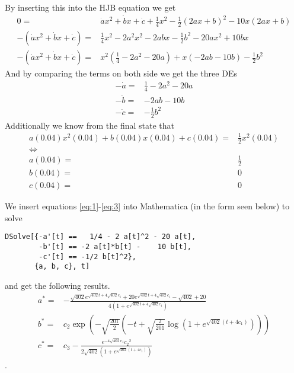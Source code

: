 \documentclass{article}
\begin{document}
By inserting this into the HJB equation we get
\begin{align}
	0 =& \dot{a}x^2 + \dot{b}x + \dot{c} + \frac{1}{4}x^2 - \frac{1}{2}(2ax + b) ^2 - 10x(2ax + b) \\
	-(\dot{a}x^2 + \dot{b}x + \dot{c})=& \frac{1}{4}x^2 -2 a^2 x^2 - 2 a b x - \frac{1}{2} b^2 - 20ax^2 + 10bx \\
	-(\dot{a}x^2 + \dot{b}x + \dot{c})=& x^2\left( \frac{1}{4}-2a^2 - 20a\right) +x(-2ab-10b) -\frac{1}{2}b^2
\end{align}
And by comparing the terms on both side we get the three DEs
\begin{align}
	-\dot{a} =& \frac{1}{4}-2a^2-20a \label{eq:1}\\
	-\dot{b} =& -2ab - 10b \label{eq:2}\\
	-\dot{c} =& -\frac{1}{2} b^2 \label{eq:3}
\end{align}
Additionally we know from the final state that 
\begin{align}
	a(0.04)x^2(0.04) + b(0.04)x(0.04) + c(0.04) =& \frac{1}{2}x^2(0.04)\\
	\iff &\\
	a(0.04) =& \frac{1}{2} \label{final_a}\\
	b(0.04) =& 0\label{final_b}\\
	c(0.04) =& 0\label{final_c}
\end{align}

We insert equations \ref{eq:1}-\ref{eq:3} into Mathematica (in the form seen below) to solve 
\begin{verbatim}
DSolve[{-a'[t] == 	1/4 - 2 a[t]^2 - 20 a[t],
        -b'[t] == -2 a[t]*b[t] - 	10 b[t],
        -c'[t] == -1/2 b[t]^2},
       {a, b, c}, t]
\end{verbatim}
and get the following results.
\begin{align}
 	a^* =& -\frac{\sqrt{402} e^{\sqrt{402} t+4 \sqrt{402} c_1}+20 e^{\sqrt{402} t+4 \sqrt{402} c_1}-\sqrt{402}+20}{4 \left(1+e^{\sqrt{402} t+4 \sqrt{402} c_1}\right)} \\
 	b^* =& c_2 \exp \left(-\sqrt{\frac{201}{2}} \left(-t+\sqrt{\frac{2}{201}} \log \left(1+e^{\sqrt{402} (t+4 c_1)}\right)\right)\right) \\
 	c^* =& c_3-\frac{e^{-4 \sqrt{402} c_1} c_2{}^2}{2 \sqrt{402} \left(1+e^{\sqrt{402} (t+4 c_1)}\right)}
\end{align}.
\end{document}
